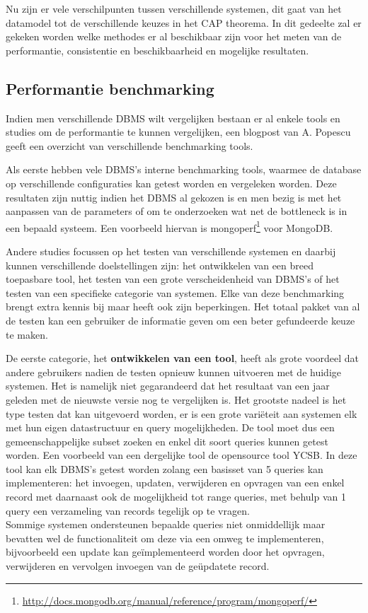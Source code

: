 Nu zijn er vele verschilpunten tussen verschillende systemen, dit gaat van het datamodel tot de verschillende keuzes in het CAP theorema. In dit gedeelte zal er gekeken worden welke methodes er al beschikbaar zijn voor het meten van de performantie, consistentie en beschikbaarheid en mogelijke resultaten. 

\subsection{Performantie benchmarking}
Indien men verschillende DBMS wilt vergelijken bestaan er al enkele tools en studies om de performantie te kunnen vergelijken, een blogpost van A. Popescu \cite{PopescuBenchmarkOverview} geeft een overzicht van verschillende benchmarking tools. 

Als eerste hebben vele DBMS's interne benchmarking tools, waarmee de database op verschillende configuraties kan getest worden en vergeleken worden. Deze resultaten zijn nuttig indien het DBMS al gekozen is en men bezig is met het aanpassen van de parameters of om te onderzoeken wat net de bottleneck is in een bepaald systeem. Een voorbeeld hiervan is mongoperf\footnote{\url{http://docs.mongodb.org/manual/reference/program/mongoperf/}} voor MongoDB. 

Andere studies focussen op het testen van verschillende systemen en daarbij kunnen verschillende doelstellingen zijn: het ontwikkelen van een breed toepasbare tool, het testen van een grote verscheidenheid van DBMS's of het testen van een specifieke categorie van systemen. Elke van deze benchmarking brengt extra kennis bij maar heeft ook zijn beperkingen. Het totaal pakket van al de testen kan een gebruiker de informatie geven om een beter gefundeerde keuze te maken. 

De eerste categorie, het \textbf{ontwikkelen van een tool}, heeft als grote voordeel dat andere gebruikers nadien de testen opnieuw kunnen uitvoeren met de huidige systemen. Het is namelijk niet gegarandeerd dat het resultaat van een jaar geleden met de nieuwste versie nog te vergelijken is.
Het grootste nadeel is het type testen dat kan uitgevoerd worden, er is een grote variëteit aan systemen elk met hun eigen datastructuur en query mogelijkheden. De tool moet dus een gemeenschappelijke subset zoeken en enkel dit soort queries kunnen getest worden. Een voorbeeld van een dergelijke tool de opensource tool YCSB\cite{cooper2010benchmarking}. In deze tool kan elk DBMS's getest worden zolang een basisset van 5 queries kan implementeren: het invoegen, updaten, verwijderen en opvragen van een enkel record met daarnaast ook de mogelijkheid tot range queries, met behulp van 1 query een verzameling van records tegelijk op te vragen. \\
Sommige systemen ondersteunen bepaalde queries niet onmiddellijk maar bevatten wel de functionaliteit om deze via een omweg te implementeren, bijvoorbeeld een update kan geïmplementeerd worden door het opvragen, verwijderen en vervolgen invoegen van de geüpdatete record. 

